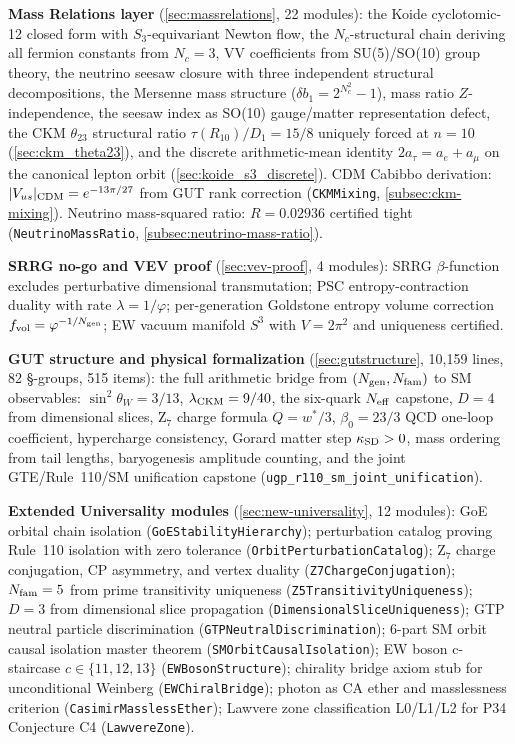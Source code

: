 \documentclass[11pt,a4paper]{article}
\theoremstyle{definition}
\begin{document}
\medskip
\noindent\textbf{Mass Relations layer}
(\cref{sec:massrelations}, 22 modules):
the Koide cyclotomic-12 closed form with $S_3$-equivariant Newton flow,
the $N_c$-structural chain deriving all fermion constants from $N_c = 3$,
VV coefficients from SU(5)/SO(10) group theory, the neutrino seesaw closure
with three independent structural decompositions, the Mersenne mass structure
($\delta b_1 = 2^{N_c^2}-1$), mass ratio $Z$-independence, the seesaw
index as SO(10) gauge/matter representation defect, the CKM $\theta_{23}$
structural ratio $\tau(R_{10})/D_1 = 15/8$ uniquely forced at $n = 10$
(\cref{sec:ckm_theta23}), and the discrete arithmetic-mean identity
$2 a_\tau = a_e + a_\mu$ on the canonical lepton orbit
(\cref{sec:koide_s3_discrete}).
CDM Cabibbo derivation: $|V_{us}|_{\rm CDM} = e^{-13\pi/27}$ from GUT rank correction
(\texttt{CKMMixing}, \cref{subsec:ckm-mixing}).
Neutrino mass-squared ratio: $R = 0.02936$ certified tight
(\texttt{NeutrinoMassRatio}, \cref{subsec:neutrino-mass-ratio}).

\medskip
\noindent\textbf{SRRG no-go and VEV proof}
(\cref{sec:vev-proof}, 4 modules):
SRRG $\beta$-function excludes perturbative dimensional transmutation;
PSC entropy-contraction duality with rate $\lambda=1/\varphi$;
per-generation Goldstone entropy volume correction $f_{\rm vol}=\varphi^{-1/N_{\rm gen}}$;
EW vacuum manifold $S^3$ with $V = 2\pi^2$ and uniqueness certified.

\medskip
\noindent\textbf{GUT structure and physical formalization}
(\cref{sec:gutstructure}, 10{,}159 lines, 82 §-groups, 515 items):
the full arithmetic bridge from $(N_{\rm gen}, N_{\rm fam})$ to SM observables:
$\sin^2\theta_W = 3/13$, $\lambda_{\rm CKM} = 9/40$, the six-quark $N_{\rm eff}$ capstone,
$D=4$ from dimensional slices, Z$_7$ charge formula $Q = w^*/3$, $\beta_0 = 23/3$ QCD
one-loop coefficient, hypercharge consistency, Gorard matter step $\kappa_{\rm SD}>0$,
mass ordering from tail lengths, baryogenesis amplitude counting, and the joint
GTE/Rule~110/SM unification capstone (\lstinline|ugp_r110_sm_joint_unification|).

\medskip
\noindent\textbf{Extended Universality modules}
(\cref{sec:new-universality}, 12 modules):
GoE orbital chain isolation (\texttt{GoEStabilityHierarchy});
perturbation catalog proving Rule~110 isolation with zero tolerance (\texttt{OrbitPerturbationCatalog});
Z$_7$ charge conjugation, CP asymmetry, and vertex duality (\texttt{Z7ChargeConjugation});
$N_{\rm fam}=5$ from prime transitivity uniqueness (\texttt{Z5TransitivityUniqueness});
$D=3$ from dimensional slice propagation (\texttt{DimensionalSliceUniqueness});
GTP neutral particle discrimination (\texttt{GTPNeutralDiscrimination});
6-part SM orbit causal isolation master theorem (\texttt{SMOrbitCausalIsolation});
EW boson c-staircase $c\in\{11,12,13\}$ (\texttt{EWBosonStructure});
chirality bridge axiom stub for unconditional Weinberg (\texttt{EWChiralBridge});
photon as CA ether and masslessness criterion (\texttt{CasimirMasslessEther});
Lawvere zone classification L0/L1/L2 for P34 Conjecture C4 (\texttt{LawvereZone}).
\end{document}

